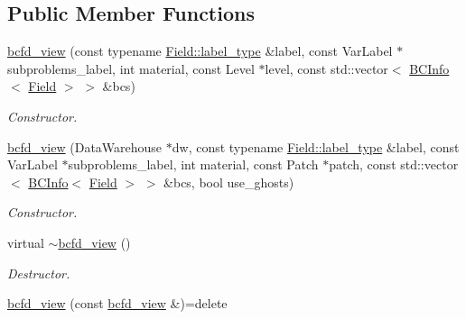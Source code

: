 \subsection*{Public Member Functions}
\begin{DoxyCompactItemize}
\item 
\hyperlink{classUintah_1_1PhaseField_1_1detail_1_1bcfd__view_3_01VectorField_3_01T_00_01N_01_4_00_01STN_00_1a8b5a6da126f9f6f13d940aa745f239_a31c9bb4fc69202ba43f6914a2f2d8a82}{bcfd\+\_\+view} (const typename \hyperlink{structUintah_1_1PhaseField_1_1VectorField_a59698346336d8cdfdf767367839f2be9}{Field\+::label\+\_\+type} \&label, const Var\+Label $\ast$subproblems\+\_\+label, int material, const Level $\ast$level, const std\+::vector$<$ \hyperlink{structUintah_1_1PhaseField_1_1BCInfo}{B\+C\+Info}$<$ \hyperlink{structUintah_1_1PhaseField_1_1VectorField}{Field} $>$ $>$ \&bcs)
\begin{DoxyCompactList}\small\item\em Constructor. \end{DoxyCompactList}\item 
\hyperlink{classUintah_1_1PhaseField_1_1detail_1_1bcfd__view_3_01VectorField_3_01T_00_01N_01_4_00_01STN_00_1a8b5a6da126f9f6f13d940aa745f239_a3b3d45ca26a000d9a3d1213cd503cadc}{bcfd\+\_\+view} (Data\+Warehouse $\ast$dw, const typename \hyperlink{structUintah_1_1PhaseField_1_1VectorField_a59698346336d8cdfdf767367839f2be9}{Field\+::label\+\_\+type} \&label, const Var\+Label $\ast$subproblems\+\_\+label, int material, const Patch $\ast$patch, const std\+::vector$<$ \hyperlink{structUintah_1_1PhaseField_1_1BCInfo}{B\+C\+Info}$<$ \hyperlink{structUintah_1_1PhaseField_1_1VectorField}{Field} $>$ $>$ \&bcs, bool use\+\_\+ghosts)
\begin{DoxyCompactList}\small\item\em Constructor. \end{DoxyCompactList}\item 
virtual \hyperlink{classUintah_1_1PhaseField_1_1detail_1_1bcfd__view_3_01VectorField_3_01T_00_01N_01_4_00_01STN_00_1a8b5a6da126f9f6f13d940aa745f239_a2216822a4f539de5f79ecae1a9ef7f10}{$\sim$bcfd\+\_\+view} ()
\begin{DoxyCompactList}\small\item\em Destructor. \end{DoxyCompactList}\item 
\hyperlink{classUintah_1_1PhaseField_1_1detail_1_1bcfd__view_3_01VectorField_3_01T_00_01N_01_4_00_01STN_00_1a8b5a6da126f9f6f13d940aa745f239_a6a0ad1ad218d4326bbac47abd2acb24f}{bcfd\+\_\+view} (const \hyperlink{classUintah_1_1PhaseField_1_1detail_1_1bcfd__view}{bcfd\+\_\+view} \&)=delete

\end{DoxyCompactItemize}
